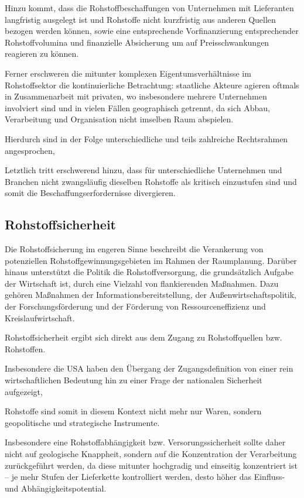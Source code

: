 \documentclass[12pt,a4paper,oneside]{book} %
\begin{document}
	Hinzu kommt, dass die Rohstoffbeschaffungen von Unternehmen mit Lieferanten langfristig ausgelegt ist und Rohstoffe nicht kurzfristig aus anderen Quellen bezogen werden können, sowie eine entsprechende Vorfinanzierung entsprechender Rohstoffvolumina und finanzielle Absicherung um auf Preisschwankungen reagieren zu können.\autocite{Pilarsky, S. 45}
	
	Ferner erschweren die mitunter komplexen Eigentumsverhältnisse im Rohstoffsektor die kontinuierliche Betrachtung: staatliche Akteure agieren oftmals in Zusammenarbeit mit privaten, wo insbesondere mehrere Unternehmen involviert sind und in vielen Fällen geographisch getrennt, da sich Abbau, Verarbeitung und Organisation nicht imselben Raum abspielen.
	
	Hierdurch sind in der Folge unterschiedliche und teils zahlreiche Rechtsrahmen angesprochen, 
	
	Letztlich tritt erschwerend hinzu, dass für unterschiedliche Unternehmen und Branchen nicht zwangsläufig dieselben Rohstoffe als kritisch einzustufen sind und somit die Beschaffungserfordernisse divergieren.

	
	\subsection{Rohstoffsicherheit}
	
	\glqq Die Rohstoffsicherung im engeren Sinne beschreibt die Verankerung von potenziellen Rohstoffgewinnungsgebieten im Rahmen der Raumplanung. Darüber hinaus unterstützt die Politik die Rohstoffversorgung, die grundsätzlich Aufgabe der Wirtschaft ist, durch eine Vielzahl von flankierenden Maßnahmen. Dazu gehören Maßnahmen der Informationsbereitstellung, der Außenwirtschaftspolitik, der Forschungsförderung und der Förderung von Ressourceneffizienz und Kreislaufwirtschaft. \grqq \autocite{Bericht zur Rohstoffsituation in Deutschland 2023}
	
	Rohstoffsicherheit ergibt sich direkt aus dem Zugang zu Rohstoffquellen bzw. Rohstoffen. 
	
	Insbesondere die USA haben den Übergang der Zugangsdefinition von einer rein wirtschaftlichen Bedeutung hin zu einer Frage der nationalen Sicherheit aufgezeigt,
	
	Rohstoffe sind somit in diesem Kontext nicht mehr nur Waren, sondern geopolitische und strategische Instrumente.
	
	Insbesondere eine Rohstoffabhängigkeit bzw. Versorungssicherheit sollte daher nicht auf geologische Knappheit, sondern auf die Konzentration der Verarbeitung zurückgeführt werden, da diese mitunter hochgradig und einseitig konzentriert ist -- je mehr Stufen der Lieferkette kontrolliert werden, desto höher das Einfluss- und Abhängigkeitspotential. 
	
\end{document}
